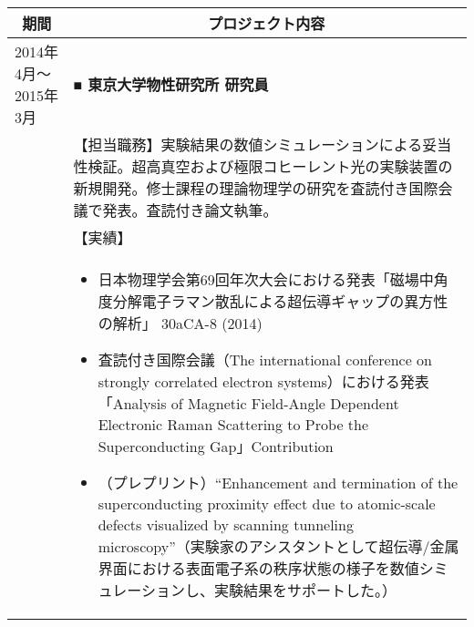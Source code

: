 \documentclass[uplatex,a4j,10.5pt,dvipdfmx]{jsarticle}
\begin{document}
\begin{longtable}{|l|p{14cm}|}
	\hline
	\multicolumn{1}{|c|}{\textbf{期間}} & \multicolumn{1}{c|}{\textbf{プロジェクト内容}}                                                                                                                                                                                                                                                                               \\
	\hline
	\endhead
	2014年4月～2015年3月                   & \textbf{■ 東京大学物性研究所 研究員}                                                                                                                                                                                                                                                                                             \\
	                                  & 【担当職務】実験結果の数値シミュレーションによる妥当性検証。超高真空および極限コヒーレント光の実験装置の新規開発。修士課程の理論物理学の研究を査読付き国際会議で発表。査読付き論文執筆。                                                                                                                                                                                                                         \\[15mm]
	                                  & 【実績】                                                                                                                                                                                                                                                                                                                 \\[-5mm]
	                                  & \begin{itemize}
		                                    \item 日本物理学会第69回年次大会における発表「磁場中角度分解電子ラマン散乱による超伝導ギャップの異方性の解析」 30aCA-8 (2014)
		                                    \item 査読付き国際会議（The international conference on strongly correlated electron systems）における発表 「Analysis of Magnetic Field-Angle Dependent Electronic Raman Scattering to Probe the Superconducting Gap」Contribution
		                                    \item （プレプリント）“Enhancement and termination of the superconducting proximity effect due to atomic-scale defects visualized by scanning tunneling microscopy”（実験家のアシスタントとして超伝導/金属界面における表面電子系の秩序状態の様子を数値シミュレーションし、実験結果をサポートした。）

\end{itemize}
\end{longtable}
\end{document}

